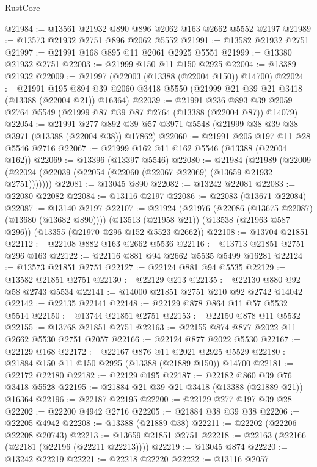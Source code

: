 \begin{lexlean}{RustCore}
\begin{coremodule}
@21984 := @13561 @21932 @890 @896 @2062 @163 @2662 @5552 @2197
@21989 := @13573 @21932 @2751 @896 @2062 @5552
@21991 := @13582 @21932 @2751
@21997 := @21991 @168 @895 @11 @2061 @2925 @5551
@21999 := @13380 @21932 @2751
@22003 := @21999 @150 @11 @150 @2925
@22004 := @13389 @21932
@22009 := @21997 (@22003 (@13388 (@22004 @150)) @14700)
@22024 := @21991
    @195
    @894
    @39
    @2060
    @3418
    @5550
    (@21999 @21 @39 @21 @3418 (@13388 (@22004 @21)) @16364)
@22039 := @21991
    @236
    @893
    @39
    @2059
    @2764
    @5549
    (@21999 @87 @39 @87 @2764 (@13388 (@22004 @87)) @14079)
@22054 := @21991
    @277
    @892
    @39
    @57
    @3971
    @5548
    (@21999 @38 @39 @38 @3971 (@13388 (@22004 @38)) @17862)
@22060 := @21991 @205 @197 @11 @28 @5546 @2716
@22067 := @21999 @162 @11 @162 @5546 (@13388 (@22004 @162))
@22069 := @13396 (@13397 @5546)
@22080 := @21984
    (@21989 (@22009 (@22024 (@22039 (@22054 (@22060 (@22067 @22069) (@13659 @21932 @2751)))))))
@22081 := @13045 @890
@22082 := @13242 @22081
@22083 := @22080 @22082
@22084 := @13116 @2197
@22086 := @22083 (@13671 @22084)
@22087 := @13140 @2197
@22107 := @21924
    (@21976 (@22086 (@13675 @22087) (@13680 (@13682 @890))))
    (@13513 (@21958 @21))
    (@13538 (@21963 @587 @296))
    (@13355 (@21970 @296 @152 @5523 @2662))
@22108 := @13704 @21851
@22112 := @22108 @882 @163 @2662 @5536
@22116 := @13713 @21851 @2751 @296 @163
@22122 := @22116 @881 @94 @2662 @5535 @5499 @16281
@22124 := @13573 @21851 @2751
@22127 := @22124 @881 @94 @5535
@22129 := @13582 @21851 @2751
@22130 := @22129 @213
@22135 := @22130 @880 @92 @58 @2743 @5534
@22141 := @14000 @21851 @2751 @210 @92 @2742 @14042
@22142 := @22135 @22141
@22148 := @22129 @878 @864 @11 @57 @5532 @5514
@22150 := @13744 @21851 @2751
@22153 := @22150 @878 @11 @5532
@22155 := @13768 @21851 @2751
@22163 := @22155 @874 @877 @2022 @11 @2662 @5530 @2751 @2057
@22166 := @22124 @877 @2022 @5530
@22167 := @22129 @168
@22172 := @22167 @876 @11 @2021 @2925 @5529
@22180 := @21884 @150 @11 @150 @2925 (@13388 (@21889 @150)) @14700
@22181 := @22172 @22180
@22182 := @22129 @195
@22187 := @22182 @860 @39 @76 @3418 @5528
@22195 := @21884 @21 @39 @21 @3418 (@13388 (@21889 @21)) @16364
@22196 := @22187 @22195
@22200 := @22129 @277 @197 @39 @28
@22202 := @22200 @4942 @2716
@22205 := @21884 @38 @39 @38
@22206 := @22205 @4942
@22208 := @13388 (@21889 @38)
@22211 := @22202 (@22206 @22208 @20743)
@22213 := @13659 @21851 @2751
@22218 := @22163 (@22166 (@22181 (@22196 (@22211 @22213))))
@22219 := @13045 @874
@22220 := @13242 @22219
@22221 := @22218 @22220
@22222 := @13116 @2057

\end{coremodule}
\end{lexlean}
